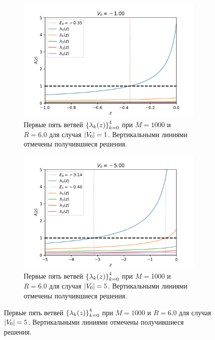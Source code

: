 \documentclass[10pt]{article}
\begin{document}
\begin{figure}[htbp]
 \centering
 \begin{subfigure}[b]{0.49\textwidth}
    \includegraphics[width=\textwidth]{../figures/-1.0_l5}
    \caption{Первые пять ветвей $\qty{\lambda_k(z)}_{k=0}^4$ при $M=1000$ и $R=6.0$ для случая $\abs{V_0}=1$. Вертикальными линиями отмечены получившиеся решения.}
    \label{fig:-1.0_l5}
\end{subfigure}
\hfill
 \begin{subfigure}[b]{0.49\textwidth}
    \includegraphics[width=\textwidth]{../figures/-5.0_l5}
    \caption{Первые пять ветвей $\qty{\lambda_k(z)}_{k=0}^4$ при $M=1000$ и $R=6.0$ для случая $\abs{V_0}=5$. Вертикальными линиями отмечены получившиеся решения.}
    \label{fig:-5.0_l5}
\end{subfigure}
\end{figure}
\end{document}
